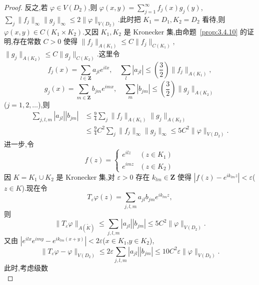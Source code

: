 \begin{proof}
反之,若 $\varphi \in V(D_{2})$,则 $\varphi(x, y) = \sum_{j=1}^{\infty}f_{j}(x)g_{j}(y)$,$\sum_{j}\|f_{j}\|_{\infty}\|g_{j}\|_{\infty} \leq 2\|\varphi\|_{V(D_{2})}$.此时把 $K_{1} = D_{1}, K_{2} = D_{2}$ 看待,则 $\varphi(x, y) \in C(K_{1} \times K_{2})$.又因 $K_{1}, K_{2}$ 是 Kronecker 集,由命题~\ref{prop:3.4.10} 的证明,存在常数 $C > 0$ 使得 $\|f_{j}\|_{A(K_{1})} \leq C\|f_{j}\|_{C(K_{1})}$,$\|g_{j}\|_{A(K_{2})} \leq C\|g_{j}\|_{C(K_{2})}$.这里令
\begin{equation*}
f_{j}(x) = \sum_{l \in \mathbf{Z}}a_{jl}e^{ilx}, \quad \sum_{l}|a_{jl}| \leq \left(\frac{3}{2}\right)\|f_{j}\|_{A(K_{1})},
\end{equation*}
\begin{equation*}
g_{j}(x) = \sum_{m \in \mathbf{Z}}b_{jm}e^{imx}, \quad \sum_{m}|b_{jm}| \leq \left(\frac{3}{2}\right)\|g_{j}\|_{A(K_{2})}
\end{equation*}
($j = 1, 2, \ldots$),则
\begin{align*}
\sum_{j,l,m}|a_{jl}||b_{jm}| &\leq \frac{9}{4}\sum_{j}\|f_{j}\|_{A(K_{1})}\|g_{j}\|_{A(K_{2})}\\
&\leq \frac{9}{4}C^{2}\sum_{j}\|f_{j}\|_{\infty}\|g_{j}\|_{\infty} \leq 5C^{2}\|\varphi\|_{V(D_{2})}.
\end{align*}
进一步,令
\begin{equation*}
f(z) = \left\{\begin{array}{ll}
e^{ilz} & (z \in K_{1})\\
e^{imz} & (z \in K_{2})
\end{array}\right.
\end{equation*}
因 $K = K_{1} \cup K_{2}$ 是 Kronecker 集,对 $\varepsilon > 0$ 存在 $k_{lm} \in \mathbf{Z}$ 使得 $|f(z) - e^{ik_{lm}z}| < \varepsilon$($z \in K$).现在令
\begin{equation*}
T_{\varepsilon}\varphi(z) = \sum_{j,l,m}a_{jl}b_{jm}e^{ik_{lm}z},
\end{equation*}
则
\begin{equation*}
\|T_{\varepsilon}\varphi\|_{A(\widetilde{K})} \leq \sum_{j,l,m}|a_{jl}||b_{jm}| \leq 5C^{2}\|\varphi\|_{V(D_{2})}.
\end{equation*}
又由 $|e^{ilx}e^{imy} - e^{ik_{lm}(x+y)}| < 2\varepsilon$($x \in K_{1}$,$y \in K_{2}$),
\begin{equation*}
\|T_{\varepsilon}\varphi - \varphi\|_{V(D_{2})} \leq 2\varepsilon\sum_{j,l,m}|a_{jl}||b_{jm}| \leq 10C^{2}\varepsilon\|\varphi\|_{V(D_{2})}.
\end{equation*}
此时,考虑级数
\begin{equation}\tag{3.4.1}

\end{equation}
\end{proof}
